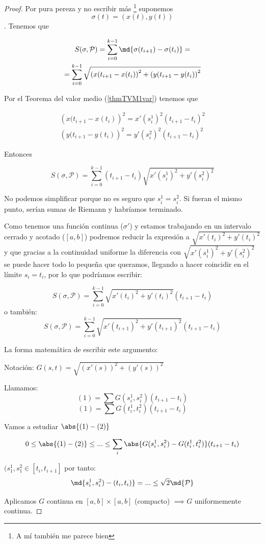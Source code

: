 \begin{proof} Por pura pereza y no escribir más \footnote{A mí también me parece bien} suponemos \[ \sigma(t) = (x(t),y(t)) \]. Tenemos que

\begin{gather*}
 S(\sigma,\mathcal{P}) = \sum_{i=0}^{k-1} \md{\sigma(t_{i+1}) - \sigma(t_i)} = \\
 = \sum_{i=0}^{k-1}\sqrt{\left(x(t_{i+1}-x(t_i)\right)^2 + \left(y(t_{i+1}-y(t_i)\right)^2}
 \end{gather*}

 Por el Teorema del valor medio (\ref{thmTVM1var}) tenemos que

 \begin{gather*}
 \left(x(t_{i+1}-x(t_i)\right)^2  = x'(s_i^1)^2(t_{i+1}-t_i)^2 \\
 \left(y(t_{i+1}-y(t_i)\right)^2  = y'(s_i^2)^2(t_{i+1}-t_i)^2
 \end{gather*}

 Entonces

 \[  S(\sigma,\mathcal{P})  = \sum_{i=0}^{k-1}  (t_{i+1}-t_i) \sqrt{x'(s_i^1)^2 + y'(s_i^2)^2} \]

 No podemos simplificar porque no es seguro que $s_i^1 = s_i^2$. Si fueran el mismo punto, serían sumas de Riemann y habríamos terminado.

 Como tenemos una función continua ($\sigma'$) y estamos trabajando en un intervalo cerrado y acotado ($[a,b]$) podremos reducir la expresión a $\sqrt{x'(t_i)^2 + y'(t_i)^2}$ y que gracias a la continuidad uniforme la diferencia con $\sqrt{x'(s_i^1)^2 + y'(s_i^2)^2}$ se puede hacer todo lo pequeña que queramos, llegando a hacer coincidir en el límite $s_i = t_i$, por lo que podríamos escribir:

\[  S(\sigma,\mathcal{P})  = \sum_{i=0}^{k-1} \sqrt{x'(t_i)^2 + y'(t_i)^2} (t_{i+1}-t_i) \]
  o también:
\[  S(\sigma,\mathcal{P})  = \sum_{i=0}^{k-1} \sqrt{x'(t_{i+1})^2 + y'(t_{i+1})^2} (t_{i+1}-t_i) \]


La forma matemática de escribir este argumento:

Notación: $G(s,t) = \sqrt{(x'(s))^2 + (y'(s))^2}$

Llamamos:
\[(1) = \sum G(s_i^1,s_i^2)(t_{i+1}-t_i)\]
\[(1) = \sum G(t_i^1,t_i^2)(t_{i+1}-t_i)\]

Vamos a estudiar $\abs{(1)-(2)}$

\[0\leq \abs{(1)-(2)} \leq ... \leq \sum_i \abs{G(s_i^1,s_i^2)- G(t_i^1,t_i^2)}(t_{i+1}-t_i)\]

$(s_1^1, s_1^2 \in [t_i,t_{i+1}]$ por tanto:
\[\md{s_i^1,s_i^2) - (t_i,t_i)} = ... \leq \sqrt{2}\md{\mathcal{P}}\]

Aplicamos $G$ continua en $[a,b]\times [a,b]$ (compacto) $\implies G$ uniformemente continua.

\end{proof}

